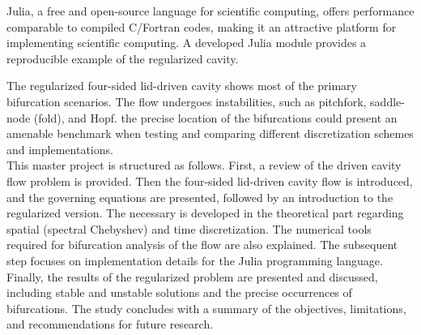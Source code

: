 Julia, a free and open-source language for scientific computing, offers
performance comparable to compiled C/Fortran codes, making it an attractive
platform for implementing scientific computing. A developed Julia module
provides a reproducible example of the regularized cavity.

The regularized four-sided lid-driven cavity shows most of the primary
bifurcation scenarios. The flow undergoes instabilities, such as pitchfork,
saddle-node (fold), and Hopf.  the precise location of the
bifurcations could present an amenable benchmark when testing and comparing
different discretization schemes and implementations. \\

This master project is structured as follows. First, a review of the driven
cavity flow problem is provided. Then the four-sided lid-driven cavity flow is
introduced, and the governing equations are presented, followed by an
introduction to the regularized version. The necessary  is
developed in the theoretical part regarding spatial (spectral Chebyshev) and
time discretization. The numerical tools required for bifurcation analysis of
the flow are also explained. The subsequent step focuses on implementation
details for the Julia programming language. Finally, the results of the
regularized problem are presented and discussed, including stable and unstable
solutions and the precise occurrences of bifurcations. The study concludes with
a summary of the objectives, limitations, and recommendations for future
research.
